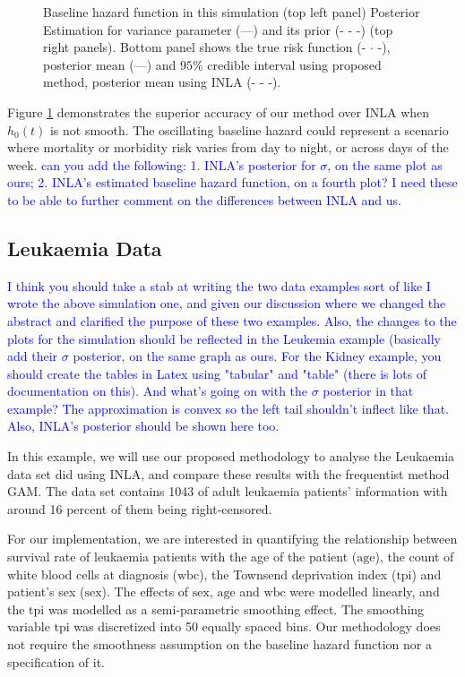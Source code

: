 \documentclass[]{article}
\newcommand{\alex}[1]{\textcolor{blue}{#1}}
\begin{document}
\begin{figure}[ht]
\caption{Baseline hazard function in this simulation (top left panel) Posterior Estimation for variance parameter (---) and its prior (- - -)  (top right panels). Bottom panel shows the true risk function (- $\cdot$ -), posterior mean (---) and $95\%$ credible interval using proposed method, posterior mean using INLA (- - -).}
\label{fig:simulation}
\end{figure}

Figure \ref{fig:simulation} demonstrates the superior accuracy of our method over INLA when $h_{0}(t)$ is not smooth. The oscillating baseline hazard could represent a scenario where mortality or morbidity risk varies from day to night, or across days of the week. \alex{can you add the following: 1. INLA's posterior for $\sigma$, on the same plot as ours; 2. INLA's estimated baseline hazard function, on a fourth plot? I need these to be able to further comment on the differences between INLA and us.}

\subsection{Leukaemia Data}

\alex{I think you should take a stab at writing the two data examples sort of like I wrote the above simulation one, and given our discussion where we changed the abstract and clarified the purpose of these two examples. Also, the changes to the plots for the simulation should be reflected in the Leukemia example (basically add their $\sigma$ posterior, on the same graph as ours. For the Kidney example, you should create the tables in Latex using "tabular" and "table" (there is lots of documentation on this). And what's going on with the $\sigma$ posterior in that example? The approximation is convex so the left tail shouldn't inflect like that. Also, INLA's posterior should be shown here too.}

In this example, we will use our proposed methodology to analyse the Leukaemia data set \citet{inlacoxph} did using INLA, and compare these results with the frequentist method GAM. The data set contains 1043 of adult leukaemia patients' information with around 16 percent of them being right-censored. 

For our implementation, we are interested in quantifying the relationship between survival rate of leukaemia patients with the age of the patient ($\text{age}$), the count of white blood cells at diagnosis ($\text{wbc}$), the Townsend deprivation index ($\text{tpi}$) and patient's sex ($\text{sex}$). The effects of $\text{sex}$, $\text{age}$ and $\text{wbc}$ were modelled linearly, and the $\text{tpi}$ was modelled as a semi-parametric smoothing effect. The smoothing variable $\text{tpi}$ was discretized into 50 equally spaced bins. Our methodology does not require the smoothness assumption on the baseline hazard function nor a specification of it.
\end{document}
